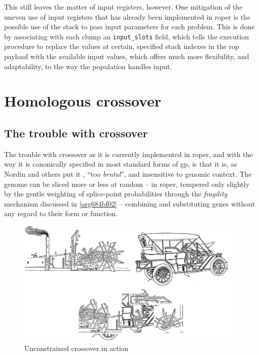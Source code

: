 \documentclass[12pt,glossary]{dalthesis}
\begin{document}
This still leaves the matter of input registers, however. One mitigation of the uneven use of
input registers that has already been implemented in \gls{roper} is the possible use of the
stack to pass input parameters for each problem. This is done by associating with each
clump an \texttt{input\_slots} field, which tells the execution procedure to replace the values at
certain, specified stack indexes in the \gls{rop} payload with the available input values, which
offers much more flexibility, and adaptability, to the way the population handles input. 

\section{Homologous crossover}
\label{sec:orga9970ba}
\label{org08b5824}
\subsection{The trouble with crossover}
\label{sec:org02bcaf7}
The trouble with crossover as it is currently implemented in \gls{roper}, and with
the way it is canonically specified in most standard forms of \gls{gp},
is that it is, as Nordin and others put it \cite{nordin99}, ``too \emph{brutal}'', and
insensitive to genomic context. The genome can be sliced more or less at random --
in \gls{roper}, tempered only slightly by the gentle weighting of splice-point probabilities
through the \emph{fragility} mechanism discussed in \ref{org684bf02} -- combining and substituting
genes without any regard to their form or function.

\begin{figure}[htbp]
\centering
\includegraphics[width=.9\linewidth]{../images/carboat-montage.png}
\caption{\label{fig:org894628e}
Unconstrained crossover in action}
\end{figure}
\end{document}
